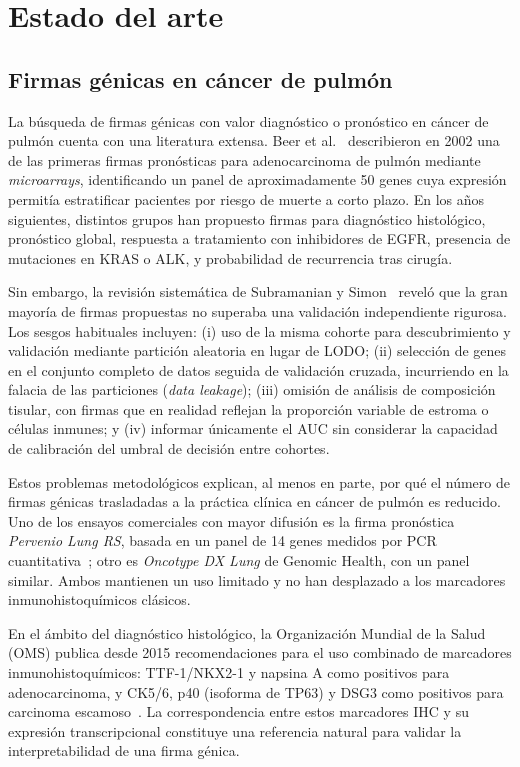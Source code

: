 \chapter{Estado del arte}
\label{cap:estado}

\section{Firmas génicas en cáncer de pulmón}
\label{sec:firmas_estado}

La búsqueda de firmas génicas con valor diagnóstico o pronóstico en cáncer
de pulmón cuenta con una literatura extensa. Beer et
al.~\cite{beer2002gene} describieron en 2002 una de las primeras firmas
pronósticas para adenocarcinoma de pulmón mediante \emph{microarrays},
identificando un panel de aproximadamente 50 genes cuya expresión permitía
estratificar pacientes por riesgo de muerte a corto plazo. En los años
siguientes, distintos grupos han propuesto firmas para diagnóstico
histológico, pronóstico global, respuesta a tratamiento con inhibidores de
EGFR, presencia de mutaciones en KRAS o ALK, y probabilidad de recurrencia
tras cirugía.

Sin embargo, la revisión sistemática de Subramanian y Simon~\cite{subramanian2010gene}
reveló que la gran mayoría de firmas propuestas no superaba una validación
independiente rigurosa. Los sesgos habituales incluyen: (i) uso de la misma
cohorte para descubrimiento y validación mediante partición aleatoria en
lugar de LODO; (ii) selección de genes en el conjunto completo de datos
seguida de validación cruzada, incurriendo en la falacia de las
particiones (\emph{data leakage}); (iii) omisión de análisis de composición
tisular, con firmas que en realidad reflejan la proporción variable de
estroma o células inmunes; y (iv) informar únicamente el AUC sin
considerar la capacidad de calibración del umbral de decisión entre
cohortes.

Estos problemas metodológicos explican, al menos en parte, por qué el
número de firmas génicas trasladadas a la práctica clínica en cáncer de
pulmón es reducido. Uno de los ensayos comerciales con mayor difusión es la
firma pronóstica \emph{Pervenio Lung RS}, basada en un panel de 14 genes
medidos por PCR cuantitativa~\cite{kratz2012practical}; otro es
\emph{Oncotype DX Lung} de Genomic Health, con un panel similar. Ambos
mantienen un uso limitado y no han desplazado a los marcadores
inmunohistoquímicos clásicos.

En el ámbito del diagnóstico histológico, la Organización Mundial de la
Salud (OMS) publica desde 2015 recomendaciones para el uso combinado de
marcadores inmunohistoquímicos: TTF-1/NKX2-1 y napsina A como positivos
para adenocarcinoma, y CK5/6, p40 (isoforma de TP63) y DSG3 como positivos
para carcinoma escamoso~\cite{travis2015who}. La correspondencia entre
estos marcadores IHC y su expresión transcripcional constituye una
referencia natural para validar la interpretabilidad de una firma génica.

